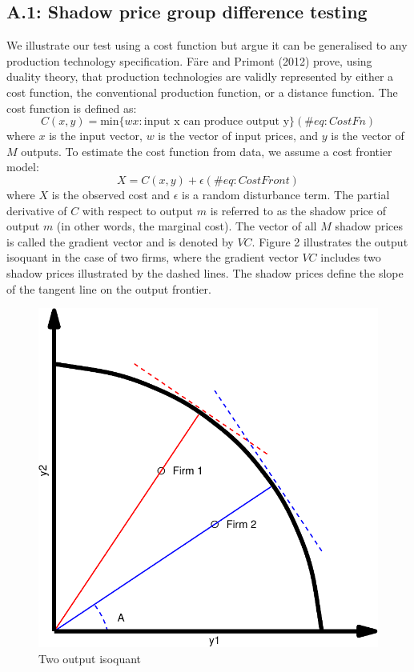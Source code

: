 \documentclass[
  10pt,
]{article}
\begin{document}
\hypertarget{a.1-shadow-price-group-difference-testing}{%
\subsection{A.1: Shadow price group difference
testing}\label{a.1-shadow-price-group-difference-testing}}

We illustrate our test using a cost function but argue it can be
generalised to any production technology specification. Färe and Primont
(2012) prove, using duality theory, that production technologies are
validly represented by either a cost function, the conventional
production function, or a distance function. The cost function is
defined as: \begin{equation}
C(x,y)=\text{min} \{wx:\text{input x can produce output y}\}
(\#eq:CostFn)
\end{equation} where \(x\) is the input vector, \(w\) is the vector of
input prices, and \(y\) is the vector of \(M\) outputs. To estimate the
cost function from data, we assume a cost frontier model:
\begin{equation}
X=C(x,y) + \epsilon
(\#eq:CostFront)
\end{equation} where \(X\) is the observed cost and \(\epsilon\) is a
random disturbance term. The partial derivative of \(C\) with respect to
output \(m\) is referred to as the shadow price of output \(m\) (in
other words, the marginal cost). The vector of all \(M\) shadow prices
is called the gradient vector and is denoted by \(VC\). Figure 2
illustrates the output isoquant in the case of two firms, where the
gradient vector \(VC\) includes two shadow prices illustrated by the
dashed lines. The shadow prices define the slope of the tangent line on
the output frontier.

\begin{figure}[H]
\includegraphics{figures/paper-isoquant-1} \caption{ Two output isoquant}\label{fig:isoquant}
\end{figure}
\end{document}

